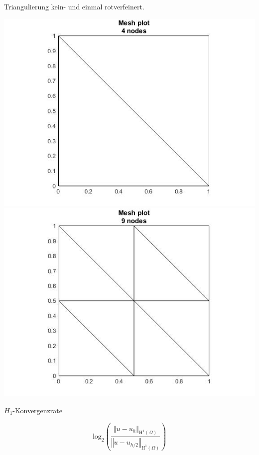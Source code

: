 \documentclass[xcolor=svgnames,ngerman]{beamer}
\providecommand{\Hh}{\ensuremath{\mathrm{H}}}
\begin{document}
				\begin{frame}{Triangulierung kein- und einmal rotverfeinert.}
\begin{center}
	\includegraphics[scale=0.3]{tri0.jpg}
	\includegraphics[scale=0.3]{tri1.jpg}
\end{center}
	\end{frame}	

\begin{frame}{$H_1$-Konvergenzrate}

$$ \mathrm{log}_2\left( \frac{\left\Vert u-u_h  \right\Vert_{\Hh^1(\Omega)}  }{ \left\Vert u-u_{h/2}  \right\Vert_{\Hh^1(\Omega)}}   \right)$$
\end{frame}
\end{document}
